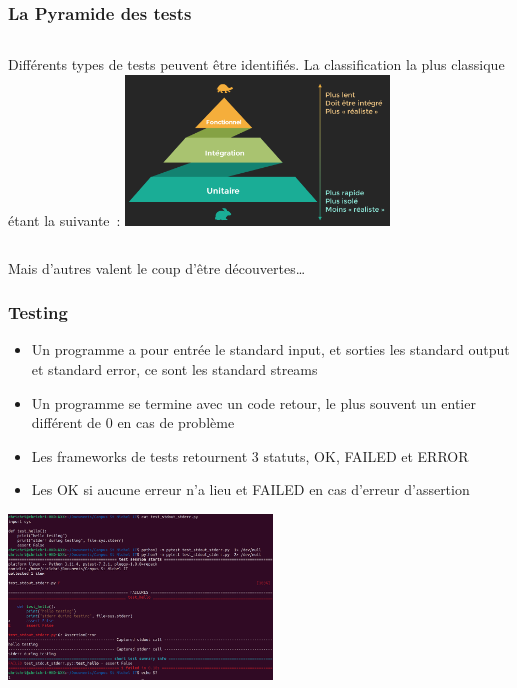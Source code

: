 \documentclass{beamer}
\begin{document}
    \begin{frame}
        \transdissolve
        \frametitle{La Pyramide des tests}
        \begin{columns}
            Différents types de tests peuvent être identifiés.
            La classification la plus classique étant la suivante\footnotemark~:
            \centering
            \includegraphics[width=7cm]{image/classic-test-pyramid}
        \end{columns}
        \bigbreak
        Mais d'autres valent le coup d'être découvertes\ldots

    \end{frame}

    \begin{frame}
        \transdissolve
        \frametitle{Testing}

        \begin{itemize}

            \item Un programme a pour entrée le standard input, et sorties les standard output et standard error, ce sont les standard streams
            \item Un programme se termine avec un code retour, le plus souvent un entier différent de 0 en cas de problème
            \item Les frameworks de tests retournent 3 statuts, OK, FAILED et ERROR
            \item Les OK si aucune erreur n'a lieu et FAILED en cas d'erreur d'assertion

        \end{itemize}

        \bigbreak

        \centering
        \includegraphics[width=7cm]{image/terminal-test-report}

    \end{frame}
\end{document}
